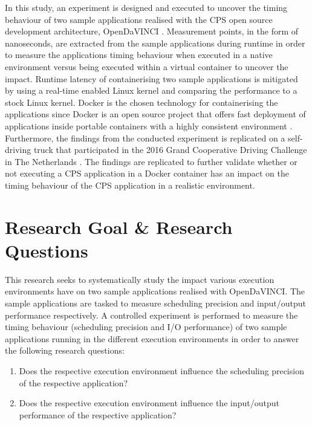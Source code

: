 In this study, an experiment is designed and executed to uncover the timing behaviour of two sample applications realised with the CPS open source development architecture, OpenDaVINCI \cite{OpenDaVINCI}. Measurement points, in the form of nanoseconds, are extracted from the sample applications during runtime in order to measure the applications timing behaviour when executed in a native environment versus being executed within a virtual container to uncover the impact. Runtime latency of containerising two sample applications is mitigated by using a real-time enabled Linux kernel and comparing the performance to a stock Linux kernel. Docker \cite{whatdocker} is the chosen technology for containerising the applications since Docker is an open source project that offers fast deployment of applications inside portable containers with a highly consistent environment \cite{bernstein2014containers}. Furthermore, the findings from the conducted experiment is replicated on a self-driving truck that participated in the 2016 Grand Cooperative Driving Challenge in The Netherlands \cite{gcdc}. The findings are replicated to further validate whether or not executing a CPS application in a Docker container has an impact on the timing behaviour of the CPS application in a realistic environment.\\

\section{Research Goal \& Research Questions}

This research seeks to systematically study the impact various execution environments have on two sample applications realised with OpenDaVINCI. The sample applications are tasked to measure scheduling precision and input/output performance respectively. A controlled experiment is performed to measure the timing behaviour (scheduling precision and I/O performance) of two sample applications running in the different execution environments in order to answer the following research questions:\\
\begin{enumerate}[label=\textbf{RQ\arabic*}]
\label{section:rqs}
	\item Does the respective execution environment influence the scheduling precision of the respective application?
	\item Does the respective execution environment influence the input/output performance of the respective application?\\
\end{enumerate}


